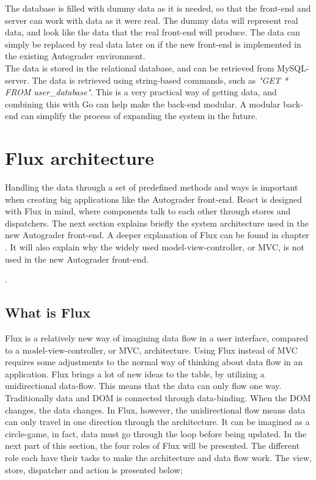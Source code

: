 The database is filled with dummy data as it is needed, so that the front-end and server can work with data as it were real. The dummy data will represent real data, and look like the data that the real front-end will produce. The data can simply be replaced by real data later on if the new front-end is implemented in the existing Autograder environment.
\\The data is stored in the relational database, and can be retrieved from MySQL-server. The data is retrieved using string-based commands, such as \emph{"GET * FROM user\_database"}. This is a very practical way of getting data, and combining this with Go can help make the back-end modular. A modular back-end can simplify the process of expanding the system in the future.

\section{Flux architecture}


Handling the data through a set of predefined methods and ways is important when creating big applications like the Autograder front-end. React is designed with Flux in mind, where components talk to each other through stores and dispatchers. The next section explains briefly the system architecture used in the new Autograder front-end. A deeper explanation of Flux can be found in chapter . It will also explain why the widely used model-view-controller, or MVC, is not used in the new Autograder front-end.

  
 .

\subsection{What is Flux}
Flux is a relatively new way of imagining data flow in a user interface, compared to a model-view-controller, or MVC, architecture. Using Flux instead of MVC requires some adjustments to the normal way of thinking about data flow in an application. Flux brings a lot of new ideas to the table, by utilizing a unidirectional data-flow. This means that the data can only flow one way. Traditionally data and DOM is connected through data-binding. When the DOM changes, the data changes. In Flux, however, the unidirectional flow means data can only travel in one direction through the architecture. It can be imagined as a circle-game, in fact, data must go through the loop before being updated. In the next part of this section, the four roles of Flux will be presented. The different role each have their tasks to make the architecture and data flow work. The view, store, dispatcher and action is presented below;

